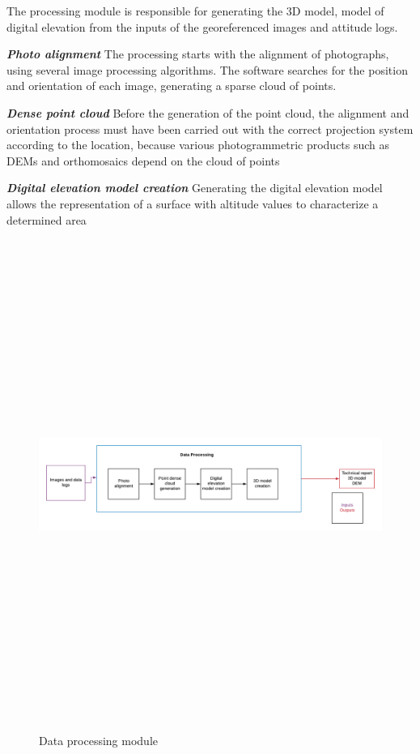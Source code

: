 The processing module is responsible for generating the 3D model, model of digital elevation from the inputs of the  georeferenced images and  attitude logs.


\textit{\textbf{Photo alignment}} \newline
The processing starts with the alignment of photographs, using several image processing algorithms. The software searches for the position and orientation of each image, generating a sparse cloud of points.

\textit{\textbf{Dense point cloud}} \newline
Before the generation of the point cloud, the alignment and orientation process must have been carried out with the correct projection system according to the location, because various photogrammetric products such as DEMs and orthomosaics depend on the cloud of points 

\textit{\textbf{Digital elevation model creation}} \newline
Generating the digital elevation model allows the representation of a surface with altitude values to characterize a determined area

\begin{figure}[h]
\centering
\includegraphics[width=16cm,height=16cm,keepaspectratio]{imagenes/DataProcessing.png}
\caption{Data processing module}
\label{fig:DataProcessing}
\end{figure}
